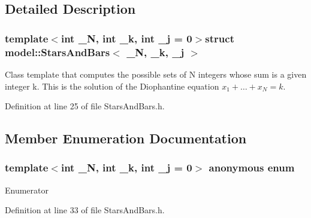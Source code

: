 \subsection{Detailed Description}
\subsubsection*{template$<$int \+\_\+\+N, int \+\_\+k, int \+\_\+j = 0$>$struct model\+::\+Stars\+And\+Bars$<$ \+\_\+\+N, \+\_\+k, \+\_\+j $>$}

Class template that computes the possible sets of N integers whose sum is a given integer k. This is the solution of the Diophantine equation $x_1+\ldots + x_N=k$. 

Definition at line 25 of file Stars\+And\+Bars.\+h.



\subsection{Member Enumeration Documentation}
\hypertarget{structmodel_1_1_stars_and_bars_a2a987546802343245775bdb4d91bbd0f}{}\subsubsection[{anonymous enum}]{\setlength{\rightskip}{0pt plus 5cm}template$<$int \+\_\+\+N, int \+\_\+k, int \+\_\+j = 0$>$ anonymous enum}\label{structmodel_1_1_stars_and_bars_a2a987546802343245775bdb4d91bbd0f}
\begin{Desc}
\item[Enumerator]\par
\begin{description}
\item[{\em 
\hypertarget{structmodel_1_1_stars_and_bars_a2a987546802343245775bdb4d91bbd0fa98c06091f7588ff9fb4f708ef6d84f42}{}N\label{structmodel_1_1_stars_and_bars_a2a987546802343245775bdb4d91bbd0fa98c06091f7588ff9fb4f708ef6d84f42}
}]\end{description}
\end{Desc}


Definition at line 33 of file Stars\+And\+Bars.\+h.

